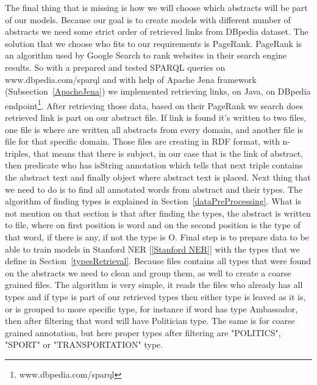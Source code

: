 \documentclass[thesis=M,english]{FITthesis}[2018/05/30]
\begin{document}
	The final thing that is missing is how we will choose which abstracts will be part of our models. Because our goal is to create models with different number of abstracts we need some strict order of retrieved links from DBpedia dataset. The solution that we choose who fits to our requirements is PageRank. PageRank \cite{wiki:PR} is an algorithm used by Google Search to rank websites in their search engine results. So with a prepared and tested SPARQL queries on www.dbpedia.com/sparql and  with help of Apache Jena framework (Subsection~\ref{ApacheJena}) we implemented retrieving links, on Java, on DBpedia endpoint\footnote{www.dbpedia.com/sparql}. After retrieving those data, based on their PageRank we search does retrieved link is part on our abstract file. If link is found it's written to two files, one file is where are written all abstracts from every domain, and another file is file for that specific domain. Those files are creating in RDF format, with n-triples, that means that there is subject, in our case that is the link of abstract, then predicate who has isString annotation which tells that next triple contains the abstract text and finally object where abstract text is placed. Next thing that we need to do is to find all annotated words from abstract and their types. The algorithm of finding types is explained in Section~\ref{dataPreProcessing}. What is not mention on that section is that after finding the types, the abstract is written to file, where on first position is word and on the second position is the type of that word, if there is any, if not the type is O. Final step is to prepare data to be able to train models in Stanford NER [\ref{Stanford NER}] with the types that we define in Section~\ref{typesRetrieval}. Because files contains all types that were found on the abstracts we need to clean and group them, as well to create a coarse grained files. The algorithm is very simple, it reads the files who already has all types and if type is part of our retrieved types then either type is leaved as it is, or is grouped to more specific type, for instance if word has type Ambassador, then after filtering that word will have Politician type. The same is for coarse grained annotation, but here proper types after filtering are "POLITICS", "SPORT" or "TRANSPORTATION" type. 
	
	
\end{document}
